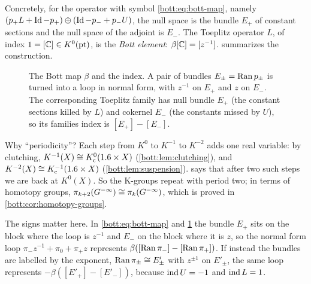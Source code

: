 Concretely, for the operator with symbol \eqref{bott:eq:bott-map}, namely
$(p_+L+\operatorname{Id}-p_+)\oplus(\operatorname{Id}-p_-+p_-U)$, the null space is the bundle $E_+$ of constant
sections and the null space of the adjoint is $E_-$. The Toeplitz operator $L$, of index
$1=[\mathbb{C}]\in K^0(\mathrm{pt})$, is the \emph{Bott element}: $\beta[\mathbb{C}]=[z^{-1}]$.
 summarizes the construction.

\begin{figure}[ht]
\centering
{}
\caption{The Bott map $\beta$ and the index. A pair of bundles $E_\pm=\operatorname{Ran} p_\pm$
is turned into a loop in normal form, with $z^{-1}$ on $E_+$ and $z$ on $E_-$.
The corresponding Toeplitz family has null bundle $E_+$ (the constant sections
killed by $L$) and cokernel $E_-$ (the constants missed by $U$), so its families
index is $[E_+]-[E_-]$.}
\label{bott:fig:bott-map}
\end{figure}

\begin{discussion}
  Why ``periodicity''? Each step from $K^0$ to $K^{-1}$ to $K^{-2}$ adds one
  real variable: by clutching, $K^{-1}(X)\cong K_{\mathrm{c}}^0(1.6\times X)$
  (\cref{bott:lem:clutching}), and $K^{-2}(X)\cong K_{\mathrm{c}}^{-1}(1.6\times X)$
  (\cref{bott:lem:suspension}).  says that after two
  such steps we are back at $K^0(X)$. So the K-groups repeat with period two;
  in terms of homotopy groups, $\pi_{k+2}(G^{-\infty})\cong\pi_k(G^{-\infty})$, which is
  proved in \cref{bott:cor:homotopy-groups}.
\end{discussion}

\begin{remark}
  The signs matter here. In \eqref{bott:eq:bott-map} and \cref{bott:fig:bott-map} the
  bundle $E_+$ sits on the block where the loop is $z^{-1}$ and $E_-$ on the block where it
  is $z$, so the normal form loop $\pi_-z^{-1}+\pi_0+\pi_+z$ represents
  $\beta([\operatorname{Ran}\pi_-]-[\operatorname{Ran}\pi_+])$. If instead the bundles are labelled by the
  exponent, $\operatorname{Ran}\pi_\pm\cong E'_\pm$ with $z^{\pm1}$ on $E'_\pm$, the same loop represents
  $-\beta([E'_+]-[E'_-])$, because $\operatorname{ind} U=-1$ and $\operatorname{ind} L=1$.
\end{remark}


